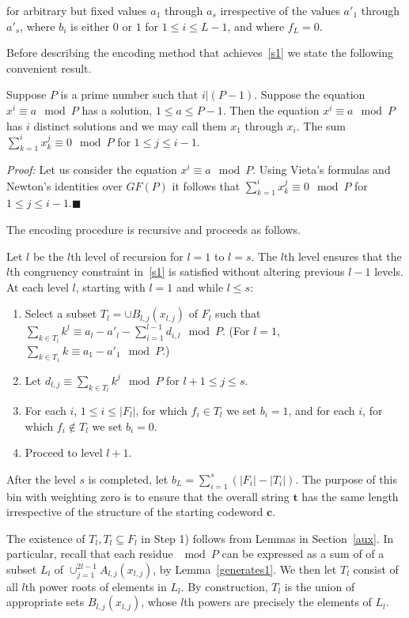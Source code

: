 for arbitrary but fixed values $a_1$ through $a_s$ irrespective of
the values ${a'}_1$ through ${a'}_s$, where $b_i$ is either $0$ or
$1$ for $1 \leq i \leq L-1$, and where $f_L=0$.

Before describing the encoding method that achieves~\eqref{s1} we
state the following convenient result.

\begin{lemma}\label{sums} Suppose $P$ is a prime number such that $i|(P-1)$. Suppose the
equation $x^i\equiv a \mod P$ has a solution, $1 \leq a \leq P-1$.
Then the equation $x^i\equiv a \mod P$ has $i$ distinct solutions
\cite{apostol} and we may call them $x_1$ through $x_i$. The sum
$\sum_{k=1}^i x_k^j \equiv 0 \mod P$ for $1 \leq j \leq i-1$.
\end{lemma}
\noindent \textit{Proof:} Let us consider the equation $x^i \equiv a
\mod P$. Using Vieta's formulas and Newton's identities over $GF(P)$
it follows that
 $\sum_{k=1}^i x_k^j \equiv 0 \mod P$ for $1 \leq j \leq
i-1$.\hfill$\blacksquare$

The encoding procedure is recursive and proceeds as follows.

Let $l$ be the $l$th level of recursion for $l=1$ to $l=s$. The
$l$th level ensures that the $l$th congruency constraint
in~\eqref{s1} is satisfied without altering previous $l-1$ levels.
 At each level $l$, starting with $l=1$ and while $l \leq s$:
\begin{enumerate}
 \item Select a subset $T_{l}=\cup B_{l,j}(x_{l,j})$ of $F_l$ such that $\sum_{k \in T_l} k^l \equiv a_l - {a'}_l -
\sum_{i=1}^{l-1} d_{i,l} \mod P$. (For $l=1$, $\sum_{k \in T_1} k
\equiv a_1 - {a'}_1 \mod P$.)\item Let $d_{l,j} \equiv \sum_{k \in
T_l} k^j \mod P$ for $l+1 \leq j\leq s$. \item For each $i$, $1 \leq
i \leq |F_l|$, for which $f_i \in T_l$ we set $b_i=1$, and for each
$i$, for which $f_i \notin T_l$ we set $b_i=0$.
\item Proceed to level $l+1$.
\end{enumerate}

After the level $s$ is completed, let $b_L=\sum_{i=1}^s (|F_i|-
|T_i|)$. The purpose of this bin with weighting zero is to ensure
that the overall string $\mathbf{t}$ has the same length
irrespective of the structure of the starting codeword $\mathbf{c}$.

The existence of $T_l, T_l \subseteq F_l$ in Step 1) follows from
Lemmas in Section~\ref{aux}. In particular, recall that each residue
$\mod P$ can be expressed as a sum of of a subset $L_{l}$ of
$\cup_{j=1}^{2l-1} A_{l,j}(x_{l,j})$, by Lemma~\ref{generates1}. We
then let $T_l$ consist of all $l$th power roots of elements in
$L_l$. By construction, $T_l$ is the union of appropriate sets
$B_{l,j}(x_{l,j})$, whose $l$th powers are precisely the elements of
$L_l$.





